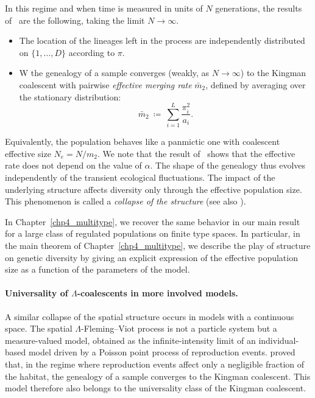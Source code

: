 In this regime and when time is measured in units of $N$ generations, the results of~\citet*{nordborg_separation_2002} are the following, taking the limit $N\to \infty$.
\begin{itemize}
\item The location of the lineages left in the process are independently distributed on $\{1,\ldots, D\}$ according to $\pi$.
\item W the genealogy of a sample converges
(weakly, as $N\to\infty$) to the Kingman coalescent with pairwise \emph{effective merging rate} $\bar m_2$, defined by averaging over the stationary distribution:
\[
  \bar m_2 \ \coloneqq\ \sum_{i=1}^{L} \frac{\pi_i^{2}}{a_i}.
\]
\end{itemize}
Equivalently, the population behaves like a panmictic one with coalescent effective size $N_e = N/m_2$.  
We note that the result of~\cite{nordborg_separation_2002} shows that the effective rate does not depend on the value of $\alpha$.  The shape of the genealogy thus evolves independently of the transient ecological
fluctuations. The impact of the underlying structure affects diversity only through the effective
population size. This phenomenon is called a \emph{collapse of the structure} (see also
\cite{nagylaki_strong-migration_1980, wilkinson-herbots_coalescence_2003}).


In Chapter~\ref{chp4_multitype}, we recover the same behavior in our main result for a large class of regulated populations on finite type
spaces. In particular, in the main theorem of Chapter~\ref{chp4_multitype}, we describe the play of structure on genetic diversity by giving an explicit expression of the effective population size as a function of the parameters of the model.

\paragraph{Universality of $\Lambda$-coalescents in more involved models.}
A similar collapse of the spatial structure occurs in models with a continuous space. The spatial $\Lambda$-Fleming--Viot process is not a particle system but a measure-valued model, obtained as the infinite-intensity limit of an individual-based model driven by a Poisson point process of reproduction events. \cite{barton_new_2010} proved that, in the regime where reproduction events affect only a negligible fraction of the habitat, the genealogy of a sample converges to the Kingman coalescent. This model therefore also belongs to the universality class of the Kingman coalescent.

